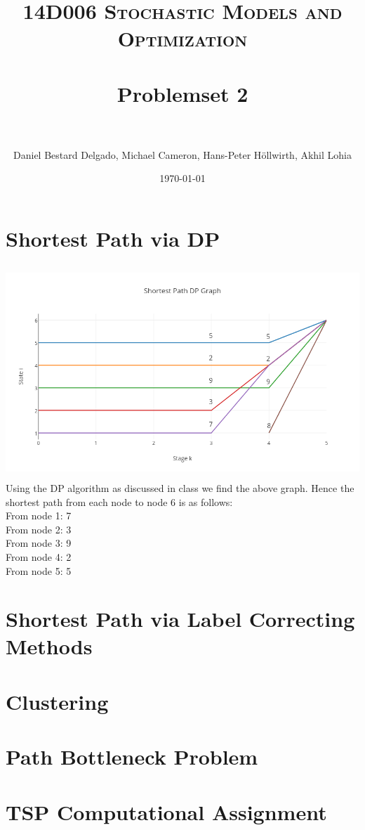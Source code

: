 \documentclass[11pt, oneside]{article}   	%
\title{	
\normalfont \normalsize 
\textsc{14D006 Stochastic Models and Optimization} \\ [25pt] %
\horrule{0.5pt} \\[0.4cm] %
\huge Problemset 2\\ %
\horrule{2pt} \\[0.5cm] %
}
\author{Daniel Bestard Delgado, Michael Cameron, Hans-Peter H{\"o}llwirth, Akhil Lohia} %
\date{\normalsize\today} %
\begin{document}
\maketitle


\section{Shortest Path via DP}


\includegraphics[width=14cm, height=8cm]{Plot2.png} \\
Using the DP algorithm as discussed in class we find the above graph. Hence the shortest path from each node to node 6 is as follows: \\
From node 1: 7 \\
From node 2: 3 \\
From node 3: 9 \\
From node 4: 2 \\
From node 5: 5


\section{Shortest Path via Label Correcting Methods}

\section{Clustering}


\section{Path Bottleneck Problem}

\section{TSP Computational Assignment}
\end{document}
